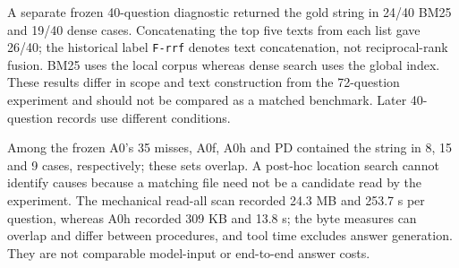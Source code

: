 A separate frozen 40-question diagnostic returned the gold string in 24/40
BM25 and 19/40 dense cases. Concatenating the top five texts from each list
gave 26/40; the historical label \texttt{F-rrf} denotes text concatenation,
not reciprocal-rank fusion. BM25 uses the local corpus whereas dense search
uses the global index. These results differ in scope and text construction
from the 72-question experiment and should not be compared as a matched
benchmark. Later 40-question records use different conditions.

Among the frozen A0's 35 misses, A0f, A0h and PD contained the string in 8,
15 and 9 cases, respectively; these sets overlap. A post-hoc location search
cannot identify causes because a matching file need not be a candidate read
by the experiment. The mechanical read-all scan recorded 24.3 MB and 253.7 s
per question, whereas A0h recorded 309 KB and 13.8 s; the byte measures can
overlap and differ between procedures, and tool time excludes answer
generation. They are not comparable model-input or end-to-end answer costs.
